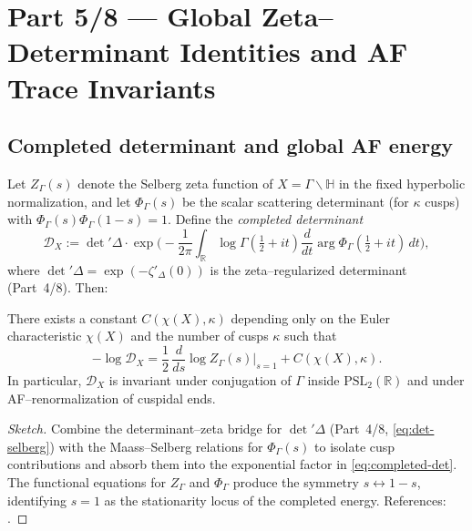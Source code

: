 \section*{Part 5/8 — Global Zeta–Determinant Identities and AF Trace Invariants}
\relax\hspace{0pt}

\subsection{Completed determinant and global AF energy}
\label{subsec:completed-det}
\relax\hspace{0pt}

Let $Z_\Gamma(s)$ denote the Selberg zeta function of $X=\Gamma\backslash\mathbb{H}$ in the fixed hyperbolic normalization, and let $\Phi_\Gamma(s)$ be the scalar scattering determinant (for $\kappa$ cusps) with $\Phi_\Gamma(s)\Phi_\Gamma(1-s)=1$. Define the \emph{completed determinant}
\begin{equation}\label{eq:completed-det}
\mathscr{D}_X
:= \det{}'\!\Delta\cdot \exp\!\Big(
-\frac{1}{2\pi}\int_{\mathbb{R}}
\log\Gamma\!\left(\tfrac12+it\right)
\frac{d}{dt}\arg\Phi_\Gamma\!\left(\tfrac12+it\right)\,dt\Big),
\end{equation}
where $\det{}'\!\Delta=\exp(-\zeta'_\Delta(0))$ is the zeta–regularized determinant (Part~4/8). Then:

\begin{theorem}
\label{thm:AF-global-energy}
There exists a constant $C(\chi(X),\kappa)$ depending only on the Euler characteristic $\chi(X)$ and the number of cusps $\kappa$ such that
\begin{equation}\label{eq:AF-global-energy}
-\log\mathscr{D}_X
= \frac12\,\frac{d}{ds}\log Z_\Gamma(s)\Big|_{s=1}
+ C(\chi(X),\kappa).
\end{equation}
In particular, $\mathscr{D}_X$ is invariant under conjugation of $\Gamma$ inside $\mathrm{PSL}_2(\mathbb{R})$ and under AF–renormalization of cuspidal ends.
\end{theorem}

\begin{proof}[Sketch]
Combine the determinant–zeta bridge for $\det{}'\!\Delta$ (Part~4/8, \eqref{eq:det-selberg}) with the Maass–Selberg relations for $\Phi_\Gamma(s)$ to isolate cusp contributions and absorb them into the exponential factor in \eqref{eq:completed-det}. The functional equations for $Z_\Gamma$ and $\Phi_\Gamma$ produce the symmetry $s\leftrightarrow 1-s$, identifying $s=1$ as the stationarity locus of the completed energy. References: \cite{HejhalII,Borthwick,Sarnak1983}. %
\end{proof}

